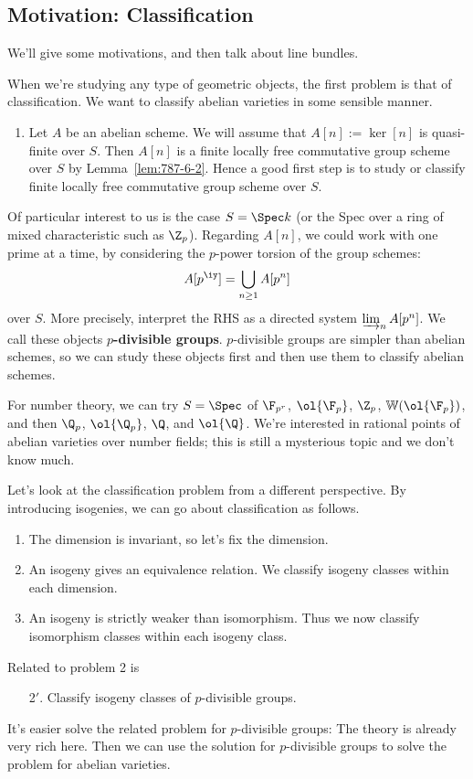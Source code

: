 \vskip0.15in
\subsection{Motivation: Classification}
We'll give some motivations, and then talk about line bundles.

When we're studying any type of geometric objects, the first problem is that of classification. We want to classify abelian varieties in some sensible manner.
\begin{enumerate}
\item
Let $A$ be an abelian scheme. We will assume that 
$A[n]:=\ker[n]$ is quasi-finite over $S$. %
Then $A[n]$ is a finite locally free commutative group scheme over $S$ by Lemma~\ref{lem:787-6-2}. 
Hence a good first step is to study or classify finite locally free commutative group scheme over $S$. 
\end{enumerate}
Of particular interest to us is the case $S=\Spec k$ (or the Spec over a ring of mixed characteristic such as $\Z_p$). Regarding $A[n]$, we could work with one prime at a time, by considering the $p$-power torsion of the group schemes:
\[
A[p^{\iy}]=\bigcup_{n\ge 1} A[p^n]
\]
over $S$. More precisely, interpret the RHS as a directed system $\varinjlim_nA[p^n]$. We call these objects \textbf{$p$-divisible groups}. $p$-divisible groups are simpler than abelian schemes, so we can study these objects first and then use them to classify abelian schemes.

For number theory, we can try $S=\Spec$ of $\F_{p^r}$, $\ol{\F_{p}}$, $\Z_p$, $\mathbb W(\ol{\F_p})$, and then $\Q_p$, $\ol{\Q_p}$, $\Q$, and $\ol{\Q}$. We're interested in rational points of abelian varieties over number fields; this is still a mysterious topic and we don't know much.

Let's look at the classification problem from a different perspective. By introducing isogenies, we can go about classification as follows.
\begin{enumerate}
\item
The dimension is invariant, so let's fix the dimension.
\item
An isogeny gives an equivalence relation. We classify isogeny classes within each dimension.
\item An isogeny is strictly weaker than isomorphism. Thus we now classify isomorphism classes within each isogeny class.
\end{enumerate}%
Related to problem 2 is 
\begin{enumerate}
\item[2$'$.]
Classify isogeny classes of $p$-divisible groups.
\end{enumerate}
It's easier solve the related problem for $p$-divisible groups:
The theory is already very rich here. Then we can use the solution for $p$-divisible groups to solve the problem for abelian varieties.

